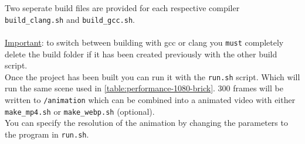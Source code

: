 \documentclass[12pt]{article}
\begin{document}
Two seperate build files are provided for each respective compiler \texttt{build\_clang.sh} and \texttt{build\_gcc.sh}. \\
\\
\underline{Important}: to switch between building with gcc or clang you \texttt{must} completely delete the build folder if it has been created previously with the other build script.\\

Once the project has been built you can run it with the \texttt{run.sh} script. Which will run the same scene used in \ref{table:performance-1080-brick}. 300 frames will be written to \texttt{/animation} which can be combined into a animated video with either \texttt{make\_mp4.sh} or \texttt{make\_webp.sh} (optional). \\

You can specify the resolution of the animation by changing the parameters to the program in \texttt{run.sh}.


\nocite{*}


\end{document}
